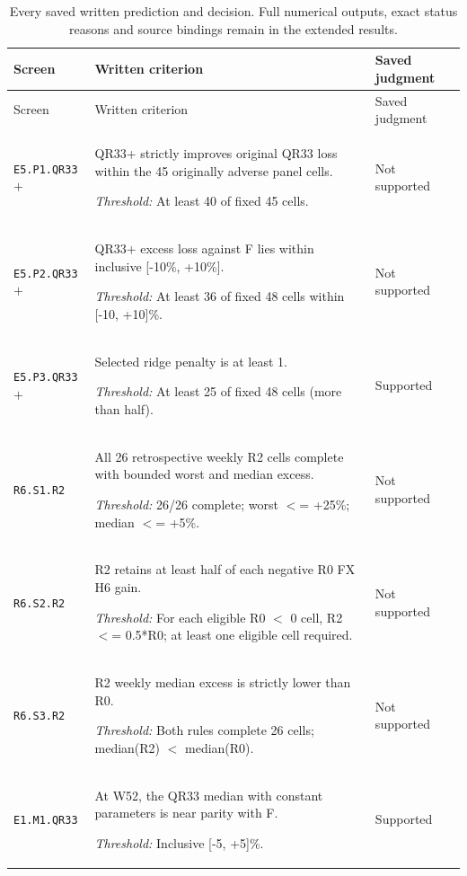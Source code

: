 \documentclass[12pt,a4paper]{article}
\begin{document}
{\footnotesize
\begin{longtable}{p{2.0cm}p{10.5cm}p{2.5cm}}
\caption{Every saved written prediction and decision. Full numerical outputs, exact status reasons and source bindings remain in the extended results.}\label{tab:submission-predictions}\\
\toprule Screen & Written criterion & Saved judgment\\\midrule\endfirsthead
\toprule Screen & Written criterion & Saved judgment\\\midrule\endhead
\texttt{E5.\allowbreak{}P1.\allowbreak{}QR33\ensuremath{+}} & QR33+ strictly improves original QR33 loss within the 45 originally adverse panel cells.\par\emph{Threshold:} At least 40 of fixed 45 cells. & Not supported \\[3pt]
\texttt{E5.\allowbreak{}P2.\allowbreak{}QR33\ensuremath{+}} & QR33+ excess loss against F lies within inclusive [-10\%,\allowbreak{} +10\%].\par\emph{Threshold:} At least 36 of fixed 48 cells within [-10,\allowbreak{} +10]\%. & Not supported \\[3pt]
\texttt{E5.\allowbreak{}P3.\allowbreak{}QR33\ensuremath{+}} & Selected ridge penalty is at least 1.\par\emph{Threshold:} At least 25 of fixed 48 cells (more than half). & Supported \\[3pt]
\texttt{R6.\allowbreak{}S1.\allowbreak{}R2} & All 26 retrospective weekly R2 cells complete with bounded worst and median excess.\par\emph{Threshold:} 26/\allowbreak{}26 complete; worst \ensuremath{<}=\allowbreak{} +25\%; median \ensuremath{<}=\allowbreak{} +5\%. & Not supported \\[3pt]
\texttt{R6.\allowbreak{}S2.\allowbreak{}R2} & R2 retains at least half of each negative R0 FX H6 gain.\par\emph{Threshold:} For each eligible R0 \ensuremath{<} 0 cell,\allowbreak{} R2 \ensuremath{<}=\allowbreak{} 0.5*R0; at least one eligible cell required. & Not supported \\[3pt]
\texttt{R6.\allowbreak{}S3.\allowbreak{}R2} & R2 weekly median excess is strictly lower than R0.\par\emph{Threshold:} Both rules complete 26 cells; median(R2) \ensuremath{<} median(R0). & Not supported \\[3pt]
\texttt{E1.\allowbreak{}M1.\allowbreak{}QR33} & At W52, the QR33 median with constant parameters is near parity with F.\par\emph{Threshold:} Inclusive [-5,\allowbreak{} +5]\%. & Supported \\[3pt]

\end{longtable}}
\end{document}
